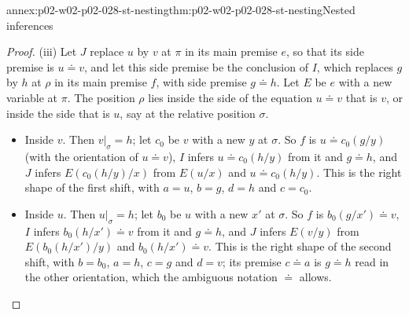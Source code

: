 \begin{annexitem}{annex:p02-w02-p02-028-st-nesting}{thm:p02-w02-p02-028-st-nesting}{Nested inferences}
\begin{proof}
(iii)  Let \(J\) replace \(u\) by \(v\) at \(\pi\) in its main premise
\(e\), so that its side premise is \(u\doteq v\), and let this side premise
be the conclusion of \(I\), which replaces \(g\) by \(h\) at \(\rho\) in its
main premise \(f\), with side premise \(g\doteq h\).  Let \(E\) be \(e\) with
a new variable at \(\pi\).  The position \(\rho\) lies inside the side of the
equation \(u\doteq v\) that is \(v\), or inside the side that is \(u\), say
at the relative position \(\sigma\).
\begin{itemize}
  \item Inside \(v\).  Then \(v|_\sigma=h\); let \(c_0\) be \(v\) with a new
        \(y\) at \(\sigma\).  So \(f\) is \(u\doteq c_0(g/y)\) (with the
        orientation of \(u\doteq v\)), \(I\) infers \(u\doteq c_0(h/y)\)
        from it and \(g\doteq h\), and \(J\) infers \(E(c_0(h/y)/x)\) from
        \(E(u/x)\) and \(u\doteq c_0(h/y)\).  This is the right shape of the
        first shift, with \(a=u\), \(b=g\), \(d=h\) and \(c=c_0\).
  \item Inside \(u\).  Then \(u|_\sigma=h\); let \(b_0\) be \(u\) with a new
        \(x'\) at \(\sigma\).  So \(f\) is \(b_0(g/x')\doteq v\), \(I\)
        infers \(b_0(h/x')\doteq v\) from it and \(g\doteq h\), and \(J\)
        infers \(E(v/y)\) from \(E(b_0(h/x')/y)\) and \(b_0(h/x')\doteq v\).
        This is the right shape of the second shift, with \(b=b_0\),
        \(a=h\), \(c=g\) and \(d=v\); its premise \(c\doteq a\) is
        \(g\doteq h\) read in the other orientation, which the ambiguous
        notation \(\doteq\) allows.
\end{itemize}
\end{proof}
\end{annexitem}

